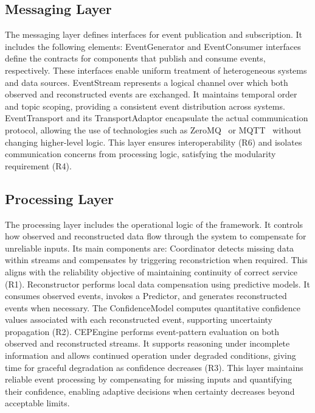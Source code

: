 \subsection{Messaging Layer}
The messaging layer defines interfaces for event publication and subscription. It includes the following elements:
EventGenerator and EventConsumer interfaces define the contracts for components that publish and consume events, respectively. These interfaces enable uniform treatment of heterogeneous systems and data sources.
EventStream represents a logical channel over which both observed and reconstructed events are exchanged.
It maintains temporal order and topic scoping, providing a consistent event distribution across systems.
EventTransport and its TransportAdaptor encapsulate the actual communication protocol, allowing the use of technologies such as ZeroMQ~\cite{zeromq_org} or MQTT~\cite{mqttspec} without changing higher-level logic.
This layer  ensures interoperability (R6) and isolates communication concerns from processing logic, satisfying the modularity requirement (R4).

\subsection{Processing Layer}
The processing layer includes the operational logic of the framework. It controls how observed and reconstructed data flow through the system to compensate for unreliable inputs. Its main components are:
Coordinator detects missing data within streams and compensates by triggering reconstriction when required.
This aligns with the reliability objective of maintaining continuity of correct service (R1).
Reconstructor performs local data compensation using predictive models. It consumes observed events, invokes a Predictor, and generates reconstructed events when necessary. The ConfidenceModel computes quantitative confidence values associated with each reconstructed event, supporting uncertainty propagation (R2).
CEPEngine performs event-pattern evaluation on both observed and reconstructed streams.
It supports reasoning under incomplete information and allows continued operation under degraded conditions, giving time for graceful degradation as confidence decreases (R3).
This layer maintains reliable event processing by compensating for missing inputs and quantifying their confidence, enabling adaptive decisions when certainty decreases beyond acceptable limits.

